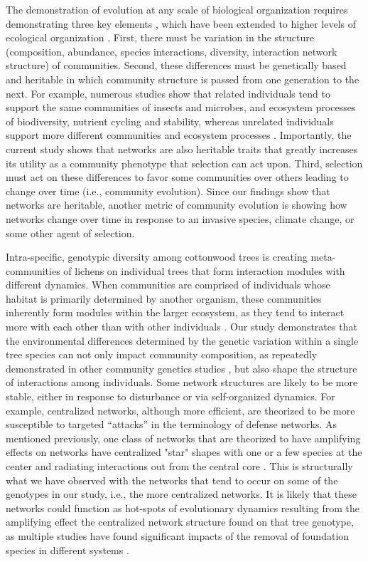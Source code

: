 \documentclass[fleqn,12pt]{olplainarticle}
\begin{document}
The demonstration of evolution at any scale of biological organization
requires demonstrating three key elements \citep{Conner2004ATextbook},
which have been extended to higher levels of ecological organization
\citep{Whitham2003, Whitham2006a, Whitham2020} . First, there must be
variation in the structure (composition, abundance, species
interactions, diversity, interaction network structure) of
communities. Second, these differences must be genetically based and
heritable in which community structure is passed from one generation
to the next. For example, numerous studies show that related
individuals tend to support the same communities of insects and
microbes, and ecosystem processes of biodiversity, nutrient cycling
and stability, whereas unrelated individuals support more different
communities and ecosystem processes \citep{Bangert2006, Bangert2008a,
  Whitham2020IntraspecificEvolution}. Importantly, the current study
shows that networks are also heritable traits that greatly increases
its utility as a community phenotype that selection can act
upon. Third, selection must act on these differences to favor some
communities over others leading to change over time (i.e., community
evolution). Since our findings show that networks are heritable,
another metric of community evolution is showing how networks change
over time in response to an invasive species, climate change, or some
other agent of selection.

Intra-specific, genotypic diversity among cottonwood trees is creating
meta-communities of lichens on individual trees that form interaction
modules with different dynamics. When communities are comprised of
individuals whose habitat is primarily determined by another organism,
these communities inherently form modules within the larger ecosystem,
as they tend to interact more with each other than with other
individuals \citep{Lau2017a}. Our study demonstrates that the
environmental differences determined by the genetic variation within a
single tree species can not only impact community composition, as
repeatedly demonstrated in other community genetics studies
\citep{Whitham2006a, DesRoches2018TheVariation}, but also shape the
structure of interactions among individuals. Some network structures
are likely to be more stable, either in response to disturbance or via
self-organized dynamics. For example, centralized networks, although
more efficient, are theorized to be more susceptible to targeted
``attacks'' in the terminology of defense networks. As mentioned
previously, one class of networks that are theorized to have
amplifying effects on networks have centralized "star" shapes with one
or a few species at the center and radiating interactions out from the
central core \citep{Lleberman2005EvolutionaryGraphs}. This is
structurally what we have observed with the networks that tend to
occur on some of the genotypes in our study, i.e., the more
centralized networks. It is likely that these networks could function
as hot-spots of evolutionary dynamics resulting from the amplifying
effect the centralized network structure found on that tree genotype,
as multiple studies have found significant impacts of the removal of
foundation species in different systems \citep{Keith2017,
  DesRoches2018TheVariation}.
\end{document}
